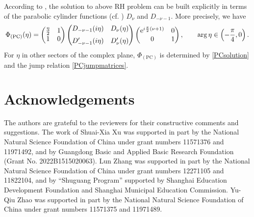 \documentclass[11pt,a4paper]{article}
\numberwithin{equation}{section}
\def\arg {\mathop{\rm arg}\nolimits}
\begin{document}
\begin{appendices}
According to \cite[Chapter 9]{FIKN}, the solution to above RH problem can be built explicitly in terms of the parabolic cylinder functions (cf. \cite[Chapter 12]{NIST}) $D_{\nu}$ and $D_{-\nu-1}$. More precisely, we have
\begin{equation}\label{PCsolution}
\Phi_\mathrm{(PC)}(\eta)=\begin{pmatrix}\frac{\eta}{2} & 1 \\ 1 & 0\end{pmatrix}
\begin{pmatrix}
D_{-\nu-1}(i\eta) & D_{\nu}(\eta) \\[.2cm]
D_{-\nu-1}'(i\eta) & D_{\nu}'(\eta)\end{pmatrix}
\begin{pmatrix}
\mathrm{e}^{i \frac{\pi}{2}(\nu+1)} & 0 \\
0 & 1
\end{pmatrix}, \qquad \arg{\eta}\in\left(-\frac{\pi}{4},0\right).
\end{equation}
For $\eta$ in other sectors of the complex plane, $\Phi_\mathrm{(PC)}$ is determined by \eqref{PCsolution} and the jump relation \eqref{PCjumpmatrices}.





\end{appendices}


\section*{Acknowledgements}
The authors are grateful to the reviewers for their constructive comments and suggestions. The work of Shuai-Xia Xu was supported in part by the National Natural Science Foundation of China under grant numbers 11571376 and 11971492, and by Guangdong Basic and Applied Basic Research Foundation (Grant No. 2022B1515020063). Lun Zhang was supported in part by the National Natural Science Foundation of China under grant numbers 12271105 and 11822104, and by ``Shuguang Program'' supported by Shanghai Education Development Foundation and Shanghai Municipal Education Commission. Yu-Qiu Zhao was supported in part by the National Natural Science Foundation of China under grant numbers 11571375 and 11971489.
\end{document}

